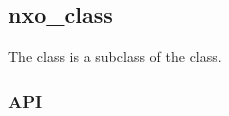 %
%
%
%
%

\subsection{nxo\_class}
\label{nxo_class}

The  class is a subclass of the  class.

\subsubsection{API}
